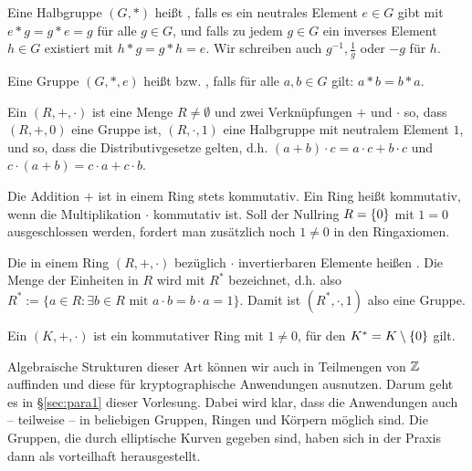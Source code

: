 \begin{defn}[Gruppe]
	Eine Halbgruppe $(G,*)$ heißt , falls es ein neutrales Element $e \in G$ gibt mit $e*g = g*e = g$ für alle $g \in G$, und falls zu jedem $g \in G$ ein inverses Element $h \in G$ existiert mit $h * g = g * h = e$. Wir schreiben auch $g^{-1}, \frac{1}{g}$ oder $-g$ für $h$.
\end{defn}

\begin{defn}
	Eine Gruppe $(G,*,e)$ heißt  bzw. , falls für alle $a, b \in G$ gilt: $a * b = b*a$. 
\end{defn}

\begin{defn}[Ring]
	Ein  $(R,+,\cdot)$  ist eine Menge $R \neq \emptyset$ und zwei Verknüpfungen $+$ und $\cdot$ so, dass $(R,+,0)$ eine Gruppe ist, $(R,\cdot,1)$ eine Halbgruppe mit neutralem Element $1$, und so, dass die Distributivgesetze gelten, d.h. $(a+b) \cdot c = a \cdot c + b \cdot c$ und $c \cdot (a+b) = c \cdot a + c \cdot b$.
\end{defn}

\begin{bem}
	Die Addition $+$ ist in einem Ring stets kommutativ. Ein Ring heißt kommutativ, wenn die Multiplikation $\cdot$ kommutativ ist. Soll der Nullring $R = \{0\}$ mit $1 = 0$ ausgeschlossen werden, fordert man zusätzlich noch $1 \neq 0$ in den Ringaxiomen.
\end{bem}

\begin{defn}
	Die in einem Ring $(R,+,\cdot)$ bezüglich $\cdot$ invertierbaren Elemente heißen . Die Menge der Einheiten in $R$ wird mit $R^*$ bezeichnet, d.h. also $R^* := \{a \in R : \exists b \in R \text{ mit } a \cdot b = b \cdot a = 1\}$. Damit ist $(R^*,\cdot,1)$ also eine Gruppe. 
\end{defn}

\begin{defn}[Körper]
	Ein  $(K,+,\cdot)$ ist ein kommutativer Ring mit $1 \neq 0$, für den $K^* = K \setminus \{0\}$ gilt.
\end{defn}

Algebraische Strukturen dieser Art können wir auch in Teilmengen von $\mathbb{Z}$ auffinden und diese für kryptographische Anwendungen ausnutzen. Darum geht es in §\ref{sec:para1} dieser Vorlesung. Dabei wird klar, dass die Anwendungen auch -- teilweise -- in beliebigen Gruppen, Ringen und Körpern möglich sind. Die Gruppen, die durch elliptische Kurven gegeben sind, haben sich in der Praxis dann als vorteilhaft herausgestellt.

